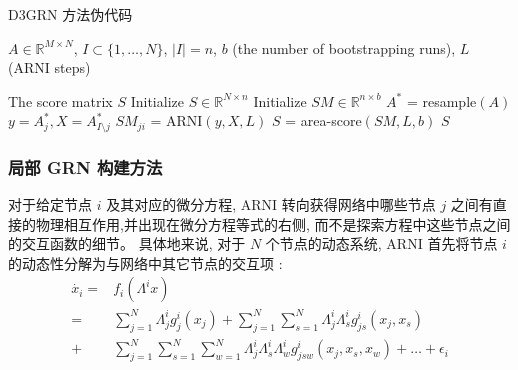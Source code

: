 \begin{algorithm}
  \renewcommand{\thealgorithm}{3-1}
  \caption{D3GRN 方法伪代码}
  \label{alg:D3GRN}
  \begin{algorithmic}[1]
  \Require  $A \in \mathbb{R}^{M \times N}$, $I \subset \{1,\ldots,N\}$, 
            $|I| = n$,
            $b$ (the number of bootstrapping runs), $L$ (ARNI steps) %
  
  \Ensure The score matrix $S$ 
  \State Initialize $S \in \mathbb{R}^{N \times n}$     
  \State Initialize $SM \in \mathbb{R}^{n \times b}$     
                                     
        \State $A^{*}$ = resample$(A)$                  
                                              
        \State $y = A^{*}_j, X = A^{*}_{I\setminus j}$
        \State $SM_{ji}$ = ARNI$(y,X,L)$                    
        \EndFor
  \EndFor           
  \State $S$ = area-score$(SM,L,b)$                      
  \State \Return $S$                                    
\end{algorithmic}
\end{algorithm}

\subsubsection{局部 GRN 构建方法}

对于给定节点 $i$ 及其对应的微分方程, 
ARNI 转向获得网络中哪些节点 $j$ 之间有直接的物理相互作用,并出现在微分方程等式的右侧, 
而不是探索方程中这些节点之间的交互函数的细节。
具体地来说, 对于 $N$ 个节点的动态系统, 
ARNI 首先将节点 $i$ 的动态性分解为与网络中其它节点的交互项 :
\begin{equation}
\label{eq:xi}
\begin{split}
\dot{x_i}= & f_i(\Lambda ^i x)\\
         = &\sum_{j=1}^{N} \Lambda^i_{j} g^i_j(x_j) + 
                             \sum_{j=1}^{N} \sum_{s=1}^{N}\Lambda^i_{j}\Lambda^i_{s}g^i_{js}(x_j,x_s)\\
         + &\sum_{j=1}^{N} \sum_{s=1}^{N} \sum_{w=1}^{N}\Lambda^i_{j}\Lambda^i_{s}\Lambda^i_{w}g^i_{jsw}(x_j,x_s,x_w)+ \ldots + \epsilon_{i}
\end{split}
\end{equation}

